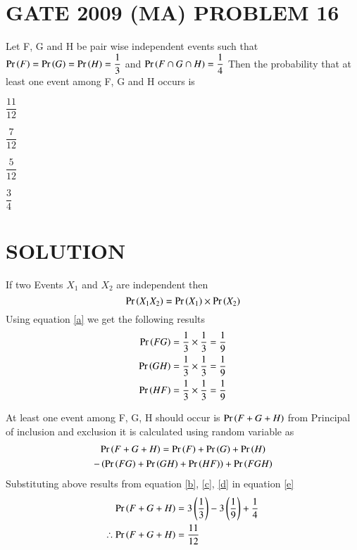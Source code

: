 \documentclass[journal,12pt,twocolumn]{IEEEtran}
\begin{document}
\section{GATE 2009 (MA) PROBLEM 16} 
Let F, G and H be pair wise independent events such that $\Pr\left(F\right)=\Pr\left(G\right)=\Pr\left(H\right)=\dfrac{1}{3}$ 
and $\Pr\left(F \cap G \cap H\right)=\dfrac{1}{4}$ Then the probability that at least one event among F, G and H occurs is 
\begin{enumerate}[(A)]
\begin{multicols}{4}
\setlength\itemsep{2em}
\item $\dfrac{11}{12}$
\item $\dfrac{7}{12}$
\item $\dfrac{5}{12}$
\item $\dfrac{3}{4}$
\end{multicols}
\end{enumerate}

\newcommand{\stcomp}[1]{{#1'}}  

\section{SOLUTION}
If two Events $X_1$ and $X_2$ are independent then 
\begin{equation}
\Pr\left(X_1 X_2\right) = \Pr\left(X_1\right) \times \Pr\left(X_2\right) \label{a}
\end{equation}
Using equation \eqref{a} we get the following results 
\begin{align}
\Pr\left(F G\right) &= \dfrac{1}{3} \times \dfrac{1}{3} = \dfrac{1}{9}\label{b} \\
\Pr\left(G H\right) &= \dfrac{1}{3} \times \dfrac{1}{3} = \dfrac{1}{9}\label{c} \\
\Pr\left(H F\right) &= \dfrac{1}{3} \times \dfrac{1}{3} = \dfrac{1}{9}\label{d}
\end{align}

At least one event among F, G, H should occur is $\Pr\left(F + G + H\right)$ 
from Principal of inclusion and exclusion it is calculated using random variable as
\begin{multline}
\Pr\left(F+G+H\right) = \Pr\left(F\right) + \Pr\left(G\right) + \Pr\left(H\right) \\
- \left(\Pr\left(F G\right) + \Pr\left(G H\right) + \Pr\left(H F\right)\right) + \Pr\left(F G H\right) \label{e}
\end{multline}
Substituting above results from equation \eqref{b}, \eqref{c}, \eqref{d} in equation \eqref{e}
\begin{align*}
\Pr\left(F+G+H\right) &= 3\left(\dfrac{1}{3}\right) - 3\left(\dfrac{1}{9}\right) + \dfrac{1}{4} \\
\therefore \Pr\left(F+G+H\right) &= \dfrac{11}{12}
\end{align*}
\end{document}
